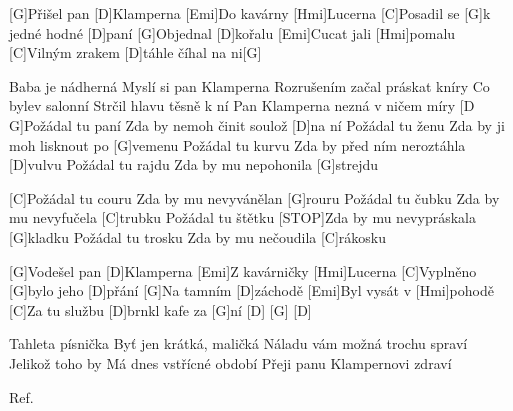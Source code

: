
[G]Přišel pan [D]Klamperna
[Emi]Do kavárny [Hmi]Lucerna
[C]Posadil se [G]k jedné hodné [D]paní
[G]Objednal [D]kořalu
[Emi]Cucat jali [Hmi]pomalu
[C]Vilným zrakem [D]táhle číhal na ni[G]

Baba je nádherná
Myslí si pan Klamperna
Rozrušením začal práskat kníry
Co bylev salonní
Strčil hlavu těsně k ní
Pan Klamperna nezná v ničem míry
[D G]Požádal tu paní
Zda by nemoh činit soulož [D]na ní
Požádal tu ženu
Zda by ji moh lisknout po [G]vemenu
Požádal tu kurvu
Zda by před ním neroztáhla [D]vulvu
Požádal tu rajdu
Zda by mu nepohonila [G]strejdu

[C]Požádal tu couru
Zda by mu nevyvánělan [G]rouru
Požádal tu čubku
Zda by mu nevyfučela [C]trubku
Požádal tu štětku
[STOP]Zda by mu nevypráskala [G]kladku
Požádal tu trosku
Zda by mu nečoudila [C]rákosku

[G]Vodešel pan [D]Klamperna
[Emi]Z kavárničky [Hmi]Lucerna
[C]Vyplněno [G]bylo jeho [D]přání
[G]Na tamním [D]záchodě
[Emi]Byl vysát v [Hmi]pohodě
[C]Za tu službu [D]brnkl kafe za [G]ní
[D] [G] [D]

Tahleta písnička
Byť jen krátká, maličká
Náladu vám možná trochu spraví
Jelikož toho by
Má dnes vstřícné období
Přeji panu Klampernovi zdraví

Ref.
